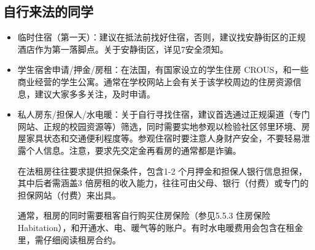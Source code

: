\subsection{自行来法的同学}
\begin{itemize}
    \item 临时住宿（第一天）：建议在抵法前找好住宿，否则，建议找安静街区的正规酒店作为第一落脚点。关于安静街区，详见7安全须知。
    \item 学生宿舍申请/押金/房租：在法国，有国家设立的学生住房 CROUS，和一些商业经营的学生公寓。通常在学校网站上会有关于该学校周边的住房资源信息，建议大家多多关注，及时申请。
    \item 私人房东/担保人/水电暖：关于自行寻找住宿，建议首选通过正规渠道（专门网站、正规的校园资源等）筛选，同时需要实地参观以检验社区邻里环境、房屋家具状态和交通便利程度等。参观住宿时要注意人身财产安全，不要轻易泄露个人信息。注意，要求先交定金再看房的通常都是诈骗。
    
    在法租房往往要求提供担保条件，包含1-2 个月押金和担保人银行信息担保，其中后者需涵盖3 倍房租的收入能力，往往可由父母、银行（付费）或专门的担保网站（付费）来出具。
    
    通常，租房的同时需要租客自行购买住房保险（参见5.5.3 住房保险Habitation），和开通水、电、暖气等的账户。有时水电暖费用会包含在租金里，需仔细阅读租房合约。
\end{itemize}
